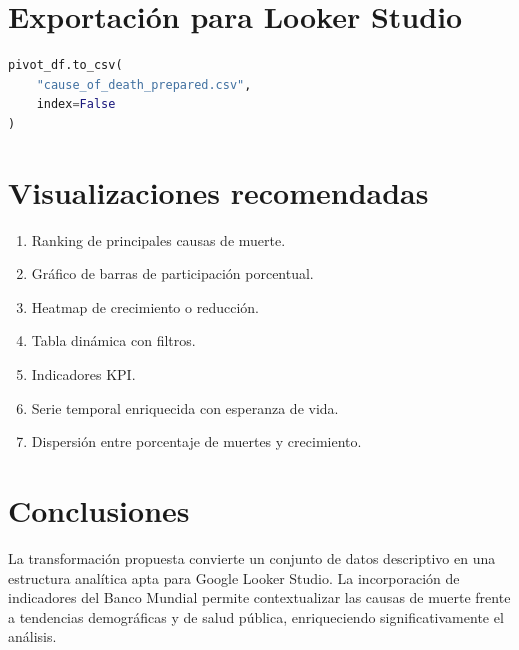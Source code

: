 \documentclass[12pt,a4paper]{article}
\begin{document}
\section{Exportación para Looker Studio}

\begin{lstlisting}[language=Python]
pivot_df.to_csv(
    "cause_of_death_prepared.csv",
    index=False
)
\end{lstlisting}

\section{Visualizaciones recomendadas}

\begin{enumerate}
\item Ranking de principales causas de muerte.
\item Gráfico de barras de participación porcentual.
\item Heatmap de crecimiento o reducción.
\item Tabla dinámica con filtros.
\item Indicadores KPI.
\item Serie temporal enriquecida con esperanza de vida.
\item Dispersión entre porcentaje de muertes y crecimiento.
\end{enumerate}

\section{Conclusiones}

La transformación propuesta convierte un conjunto de datos descriptivo en una estructura analítica apta para Google Looker Studio. La incorporación de indicadores del Banco Mundial permite contextualizar las causas de muerte frente a tendencias demográficas y de salud pública, enriqueciendo significativamente el análisis.
\end{document}
